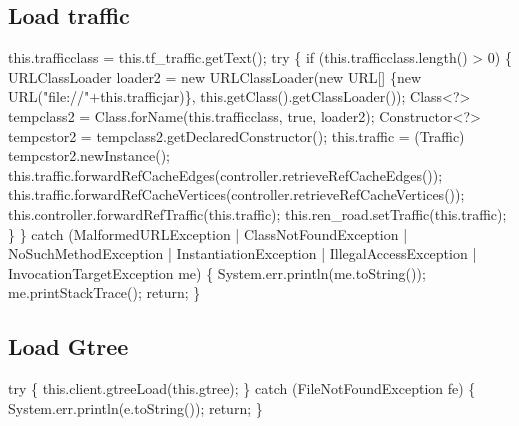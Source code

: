 \subsection{Load traffic}
\nwenddocs{}\endmoddef{}
this.trafficclass = this.tf_traffic.getText();
try \{
  if (this.trafficclass.length() > 0) \{
    URLClassLoader loader2 = new URLClassLoader(new URL[] \{new URL("file://"+this.trafficjar)\},
        this.getClass().getClassLoader());
    Class<?> tempclass2 = Class.forName(this.trafficclass, true, loader2);
    Constructor<?> tempcstor2 = tempclass2.getDeclaredConstructor();
    this.traffic = (Traffic) tempcstor2.newInstance();
    this.traffic.forwardRefCacheEdges(controller.retrieveRefCacheEdges());
    this.traffic.forwardRefCacheVertices(controller.retrieveRefCacheVertices());
    this.controller.forwardRefTraffic(this.traffic);
    this.ren_road.setTraffic(this.traffic);
  \}
\} catch (MalformedURLException
    | ClassNotFoundException
    | NoSuchMethodException
    | InstantiationException
    | IllegalAccessException
    | InvocationTargetException me) \{
  System.err.println(me.toString());
  me.printStackTrace();
  return;
\}
\nwendcode{}\nwdocspar

\subsection{Load Gtree}
\nwenddocs{}\endmoddef{}
try \{
  this.client.gtreeLoad(this.gtree);
\} catch (FileNotFoundException fe) \{
  System.err.println(e.toString());
  return;
\}
\nwendcode{}\nwdocspar

